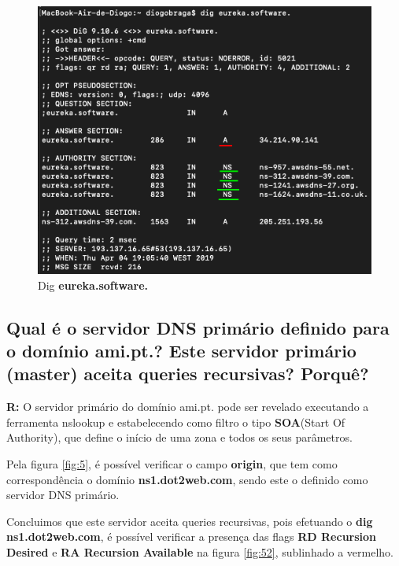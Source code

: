 \documentclass{llncs}
\begin{document}
\begin{figure}[H]
\begin{center}
\includegraphics[scale=0.6]{4.png}
\end{center}
\caption{\label{fig:4}Dig \textbf{eureka.software.}}
\end{figure}


\subsection{\textbf{Qual é o servidor DNS primário definido para o domínio ami.pt.? Este servidor primário (master) aceita queries recursivas? Porquê?}}
\textbf{R:} O servidor primário do domínio ami.pt. pode ser revelado executando a ferramenta nslookup e estabelecendo como filtro o tipo \textbf{SOA}(Start Of Authority), que define o início de uma zona e todos os seus parâmetros.

Pela figura \ref{fig:5}, é possível verificar o campo \textbf{origin}, que tem como correspondência o domínio \textbf{ns1.dot2web.com}, sendo este o definido como servidor DNS primário.

Concluimos que este servidor aceita queries recursivas, pois efetuando o \textbf{dig ns1.dot2web.com}, é possível verificar a presença das flags \textbf{RD Recursion Desired} e \textbf{RA Recursion Available} na figura \ref{fig:52}, sublinhado a vermelho.
\end{document}
